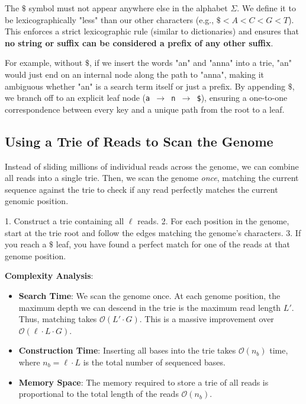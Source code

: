 \sta The \(\$\) symbol must not appear anywhere else in the alphabet \(\Sigma\). We define it to be lexicographically "less" than our other characters (e.g., \(\$ < A < C < G < T\)). This enforces a strict lexicographic rule (similar to dictionaries) and ensures that \textbf{no string or suffix can be considered a prefix of any other suffix}.

For example, without \(\$\), if we insert the words "an" and "anna" into a trie, "an" would just end on an internal node along the path to "anna", making it ambiguous whether "an" is a search term itself or just a prefix. By appending \(\$\), we branch off to an explicit leaf node (\texttt{a $\rightarrow$ n $\rightarrow$ \$}), ensuring a one-to-one correspondence between every key and a unique path from the root to a leaf.

\subsection{Using a Trie of Reads to Scan the Genome}

Instead of sliding millions of individual reads across the genome, we can combine all reads into a single trie. Then, we scan the genome \textit{once}, matching the current sequence against the trie to check if any read perfectly matches the current genomic position.

1. Construct a trie containing all \(\ell\) reads.
2. For each position in the genome, start at the trie root and follow the edges matching the genome's characters.
3. If you reach a \(\$\) leaf, you have found a perfect match for one of the reads at that genome position.

\textbf{Complexity Analysis}:
\begin{itemize}
    \item \textbf{Search Time}: We scan the genome once. At each genome position, the maximum depth we can descend in the trie is the maximum read length \(L'\). Thus, matching takes \(\mathcal{O}(L' \cdot G)\). This is a massive improvement over \(\mathcal{O}(\ell \cdot L \cdot G)\).
    \item \textbf{Construction Time}: Inserting all bases into the trie takes \(\mathcal{O}(n_b)\) time, where \(n_b = \ell \cdot L\) is the total number of sequenced bases.
    \item \textbf{Memory Space}: The memory required to store a trie of all reads is proportional to the total length of the reads \(\mathcal{O}(n_b)\).
\end{itemize}

